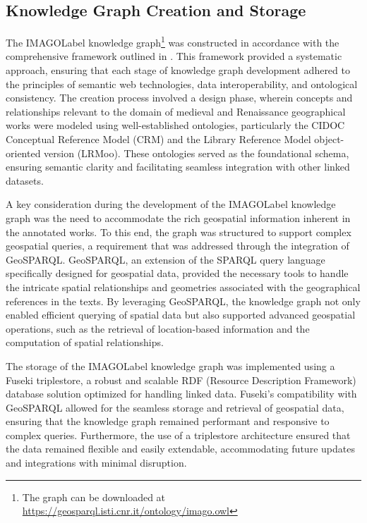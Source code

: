 \subsection{Knowledge Graph Creation and Storage}\label{VII-subsec:imago-kg}

The \acrshort{IMAGOLabel} knowledge graph\footnote{The graph can be downloaded at \url{https://geosparql.isti.cnr.it/ontology/imago.owl}} was constructed in accordance with the comprehensive framework outlined in  . This framework provided a systematic approach, ensuring that each stage of knowledge graph development adhered to the principles of semantic web technologies, data interoperability, and ontological consistency. The creation process involved a design phase, wherein concepts and relationships relevant to the domain of medieval and Renaissance geographical works were modeled using well-established ontologies, particularly the CIDOC Conceptual Reference Model (CRM) and the Library Reference Model object-oriented version (LRMoo). These ontologies served as the foundational schema, ensuring semantic clarity and facilitating seamless integration with other linked datasets.

A key consideration during the development of the \acrshort{IMAGOLabel} knowledge graph was the need to accommodate the rich geospatial information inherent in the annotated works. To this end, the graph was structured to support complex geospatial queries, a requirement that was addressed through the integration of GeoSPARQL. GeoSPARQL, an extension of the SPARQL query language specifically designed for geospatial data, provided the necessary tools to handle the intricate spatial relationships and geometries associated with the geographical references in the texts. By leveraging GeoSPARQL, the knowledge graph not only enabled efficient querying of spatial data but also supported advanced geospatial operations, such as the retrieval of location-based information and the computation of spatial relationships.

The storage of the \acrshort{IMAGOLabel} knowledge graph was implemented using a Fuseki triplestore, a robust and scalable RDF (Resource Description Framework) database solution optimized for handling linked data. Fuseki’s compatibility with GeoSPARQL allowed for the seamless storage and retrieval of geospatial data, ensuring that the knowledge graph remained performant and responsive to complex queries. Furthermore, the use of a triplestore architecture ensured that the data remained flexible and easily extendable, accommodating future updates and integrations with minimal disruption.

